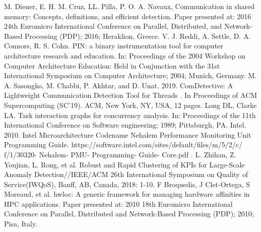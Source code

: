 \documentclass[a4paper,fleqn]{cas-sc}
\begin{document}
\begin{thebibliography}{70}
M. Diener, E. H. M. Cruz, LL. Pilla, P. O. A. Navaux, Communication in shared memory: Concepts, definitions, and efficient detection. Paper presented at: 2016 24th Euromicro International Conference on Parallel, Distributed, and Network-Based Processing (PDP); 2016; Heraklion, Greece.
V. J. Reddi, A. Settle, D. A. Connors, R. S. Cohn. PIN: a binary instrumentation tool for computer architecture research and education. In: Proceedings of the 2004 Workshop on Computer Architecture Education: Held in Conjunction with the 31st International Symposium on Computer Architecture; 2004; Munich, Germany.
M. A. Sasongko, M. Chabbi, P. Akhtar, and D. Unat. 2019. ComDetective: A Lightweight Communication Detection Tool for Threads . In Proceedings of ACM Supercomputing (SC’19). ACM, New York, NY, USA, 12 pages.
Long DL, Clarke LA. Task interaction graphs for concurrency analysis. In: Proceedings of the 11th International Conference on Software engineering; 1989; Pittsburgh, PA.
Intel. 2010. Intel Microarchitecture Codename Nehalem Performance Monitoring Unit Programming Guide. https://software.intel.com/sites/default/files/m/5/2/c/ f/1/30320- Nehalem- PMU- Programming- Guide- Core.pdf .
 L. Zhihan, Z. Youjian, L. Rong, et al. Robust and Rapid Clustering of KPIs for Large-Scale Anomaly Detection//IEEE/ACM 26th International Symposium on Quality of Service(IWQoS), Banff, AB, Canada, 2018: 1-10.
F  Broquedis, J Clet-Ortega, S Moreaud, et al. hwloc: A generic framework for managing hardware affinities in HPC applications. Paper presented at: 2010 18th Euromicro International Conference on Parallel, Distributed and Network-Based Processing (PDP); 2010; Pisa, Italy.
\end{thebibliography}







\end{document}
